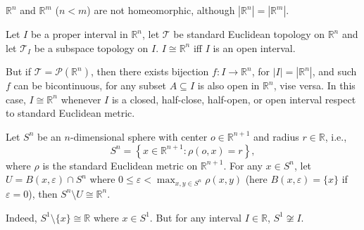 \begin{example}
	$\mathbb R^n$ and $\mathbb R^m$ ($n < m$) are not homeomorphic, although $|\mathbb R^n| = |\mathbb R^m|$.
\end{example}


\begin{example}
	Let $I$ be a proper interval in $\mathbb R^n$, let $\mathcal T$ be standard Euclidean topology on $\mathbb R^n$ and let $\mathcal T_I$ be a subspace topology on $I$. $I \cong \mathbb R^n$ iff $I$ is an open interval.
	
	But if $\mathcal T = \mathcal P(\mathbb R^n)$, then there exists bijection $f: I \to \mathbb R^n$, for $|I| = |\mathbb R^n|$, and such $f$ can be bicontinuous, for any subset $A \subseteq I$ is also open in $\mathbb R^n$, vise versa. In this case, $I \cong \mathbb R^n$ whenever $I$ is a closed, half-close, half-open, or open interval respect to standard Euclidean metric.
\end{example}


\begin{example}
	Let $S^n$ be an $n$-dimensional sphere with center $o \in \mathbb R^{n + 1}$ and radius $r \in \mathbb R$, i.e.,
	$$
	S^n = \left\{ x \in \mathbb R^{n + 1} : \rho(o, x) = r \right\},
	$$
	where $\rho$ is the standard Euclidean metric on $\mathbb R^{n+1}$. For any $x \in S^n$, let $U = B(x, \varepsilon) \cap S^n$ where $0\le \varepsilon < \max_{x,y \in S^n} \rho(x,y)$ (here $B(x, \varepsilon) = \{x\}$ if $\varepsilon = 0$), then $S^n \setminus U \cong \mathbb R^{n}$.
\end{example}


\begin{example}
	Indeed, $S^1 \setminus \{x\} \cong \mathbb R$ where $x \in S^1$. But for any interval $I \in \mathbb R$, $S^1 \not \cong I$.
\end{example}




































%